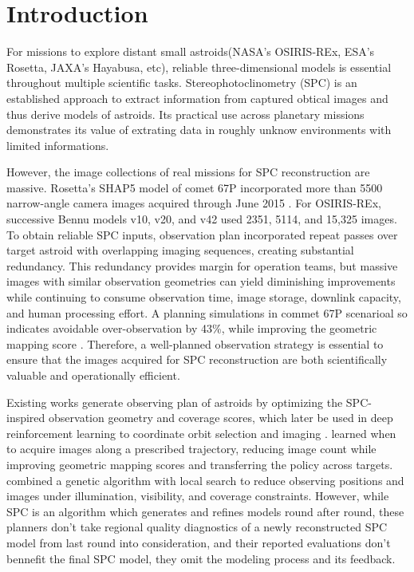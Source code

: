 \section{Introduction}
\label{sec:introduction}


For missions to explore distant small astroids(NASA's OSIRIS-REx\citep{alasad2021}, ESA's Rosetta\citep{taylor2017rosetta}, JAXA's Hayabusa\citep{fujiwara2006,demura2006}, etc), reliable three-dimensional models is essential throughout multiple scientific tasks. Stereophotoclinometry (SPC)\citep{barnouin2020} is an established approach to extract information from captured obtical images and thus derive models of astroids. Its practical use across planetary missions demonstrates its value of extrating data in roughly unknow environments with limited informations. 

However, the image collections of real missions for SPC reconstruction are massive. Rosetta's SHAP5 model of comet 67P incorporated more than 5500 narrow-angle camera images acquired through June 2015 \citep{preusker2017}. For OSIRIS-REx, successive Bennu models v10, v20, and v42 used 2351, 5114, and 15,325 images\citep{palmer2022}. To obtain reliable SPC inputs, observation plan incorporated repeat passes over target astroid with overlapping imaging sequences, creating substantial redundancy. This redundancy provides margin for operation teams, but massive images with similar observation geometries can yield diminishing improvements while continuing to consume observation time, image storage, downlink capacity, and human processing effort. A planning simulations in commet 67P scenarioal so indicates avoidable over-observation by 43\%, while improving the geometric mapping score \citep{piccinin2022}. Therefore, a well-planned observation strategy is essential to ensure that the images acquired for SPC reconstruction are both scientifically valuable and operationally efficient.

Existing works generate observing plan of astroids by optimizing the SPC-inspired observation geometry and coverage scores\citep{pesce2018mapping}, which later be used in deep reinforcement learning to coordinate orbit selection and imaging \citep{chan2019mapping}. \citet{piccinin2022} learned when to acquire images along a prescribed trajectory, reducing image count while improving geometric mapping scores and transferring the policy across targets. \citet{wang2025} combined a genetic algorithm with local search to reduce observing positions and images under illumination, visibility, and coverage constraints. However, while SPC is an algorithm which generates and refines models round after round, these planners don't take regional quality diagnostics of a newly reconstructed SPC model from last round into consideration, and their reported evaluations don't bennefit the final SPC model, they omit the modeling process and its feedback. 

